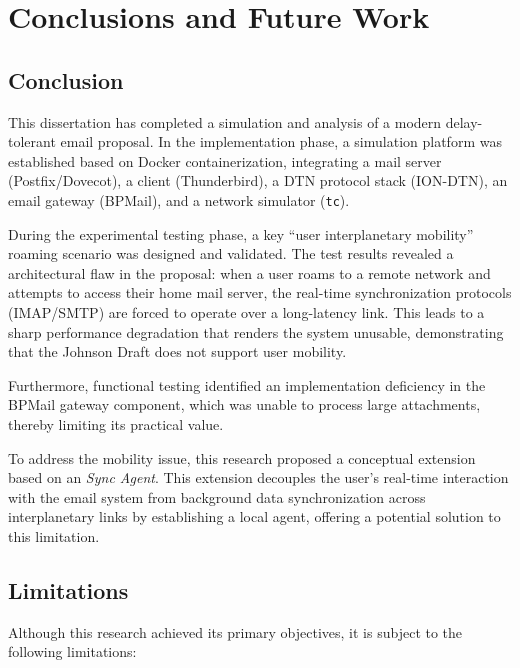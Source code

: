 \chapter{Conclusions and Future Work}
\section{Conclusion}

This dissertation has completed a simulation and analysis of a modern delay-tolerant email proposal.  
In the implementation phase, a simulation platform was established based on Docker containerization, integrating a mail server (Postfix/Dovecot), a client (Thunderbird), a DTN protocol stack (ION-DTN), an email gateway (BPMail), and a network simulator (\texttt{tc}).

During the experimental testing phase, a key ``user interplanetary mobility'' roaming scenario was designed and validated.  
The test results revealed a architectural flaw in the proposal: when a user roams to a remote network and attempts to access their home mail server, the real-time synchronization protocols (IMAP/SMTP) are forced to operate over a long-latency link.
This leads to a sharp performance degradation that renders the system unusable, demonstrating that the Johnson Draft does not support user mobility.  

Furthermore, functional testing identified an implementation deficiency in the BPMail gateway component, which was unable to process large attachments, thereby limiting its practical value.

To address the mobility issue, this research proposed a conceptual extension based on an \textit{Sync Agent}.  
This extension decouples the user's real-time interaction with the email system from background data synchronization across interplanetary links by establishing a local agent, offering a potential solution to this limitation.

\section{Limitations}

Although this research achieved its primary objectives, it is subject to the following limitations:

